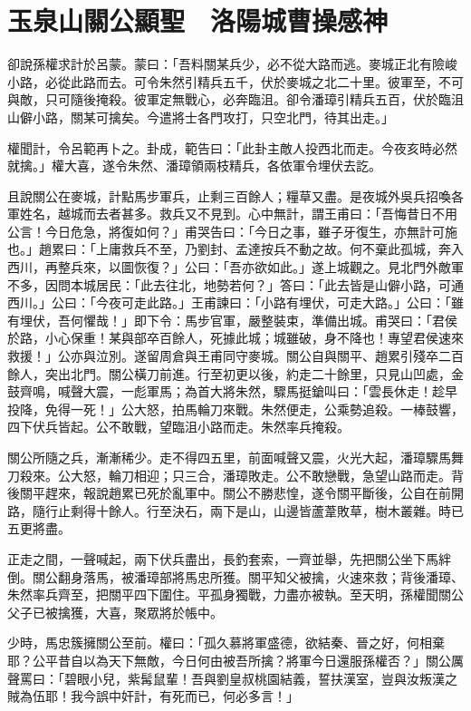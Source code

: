 
\chapter{玉泉山關公顯聖　洛陽城曹操感神}

卻說孫權求計於呂蒙。蒙曰：「吾料關某兵少，必不從大路而逃。麥城正北有險峻小路，必從此路而去。可令朱然引精兵五千，伏於麥城之北二十里。彼軍至，不可與敵，只可隨後掩殺。彼軍定無戰心，必奔臨沮。卻令潘璋引精兵五百，伏於臨沮山僻小路，關某可擒矣。今遣將士各門攻打，只空北門，待其出走。」

權聞計，令呂範再卜之。卦成，範告曰：「此卦主敵人投西北而走。今夜亥時必然就擒。」權大喜，遂令朱然、潘璋領兩枝精兵，各依軍令埋伏去訖。

且說關公在麥城，計點馬步軍兵，止剩三百餘人；糧草又盡。是夜城外吳兵招喚各軍姓名，越城而去者甚多。救兵又不見到。心中無計，謂王甫曰：「吾悔昔日不用公言！今日危急，將復如何？」甫哭告曰：「今日之事，雖子牙復生，亦無計可施也。」趙累曰：「上庸救兵不至，乃劉封、孟達按兵不動之故。何不棄此孤城，奔入西川，再整兵來，以圖恢復？」公曰：「吾亦欲如此。」遂上城觀之。見北門外敵軍不多，因問本城居民：「此去往北，地勢若何？」答曰：「此去皆是山僻小路，可通西川。」公曰：「今夜可走此路。」王甫諫曰：「小路有埋伏，可走大路。」公曰：「雖有埋伏，吾何懼哉！」即下令：馬步官軍，嚴整裝束，準備出城。甫哭曰：「君侯於路，小心保重！某與部卒百餘人，死據此城；城雖破，身不降也！專望君侯速來救援！」公亦與泣別。遂留周倉與王甫同守麥城。關公自與關平、趙累引殘卒二百餘人，突出北門。關公橫刀前進。行至初更以後，約走二十餘里，只見山凹處，金鼓齊鳴，喊聲大震，一彪軍馬；為首大將朱然，驟馬挺鎗叫曰：「雲長休走！趁早投降，免得一死！」公大怒，拍馬輪刀來戰。朱然便走，公乘勢追殺。一棒鼓響，四下伏兵皆起。公不敢戰，望臨沮小路而走。朱然率兵掩殺。

關公所隨之兵，漸漸稀少。走不得四五里，前面喊聲又震，火光大起，潘璋驟馬舞刀殺來。公大怒，輪刀相迎；只三合，潘璋敗走。公不敢戀戰，急望山路而走。背後關平趕來，報說趙累已死於亂軍中。關公不勝悲惶，遂令關平斷後，公自在前開路，隨行止剩得十餘人。行至決石，兩下是山，山邊皆蘆葦敗草，樹木叢雜。時已五更將盡。

正走之間，一聲喊起，兩下伏兵盡出，長釣套索，一齊並舉，先把關公坐下馬絆倒。關公翻身落馬，被潘璋部將馬忠所獲。關平知父被擒，火速來救；背後潘璋、朱然率兵齊至，把關平四下圍住。平孤身獨戰，力盡亦被執。至天明，孫權聞關公父子已被擒獲，大喜，聚眾將於帳中。

少時，馬忠簇擁關公至前。權曰：「孤久慕將軍盛德，欲結秦、晉之好，何相棄耶？公平昔自以為天下無敵，今日何由被吾所擒？將軍今日還服孫權否？」關公厲聲罵曰：「碧眼小兒，紫髯鼠輩！吾與劉皇叔桃園結義，誓扶漢室，豈與汝叛漢之賊為伍耶！我今誤中奸計，有死而已，何必多言！」

